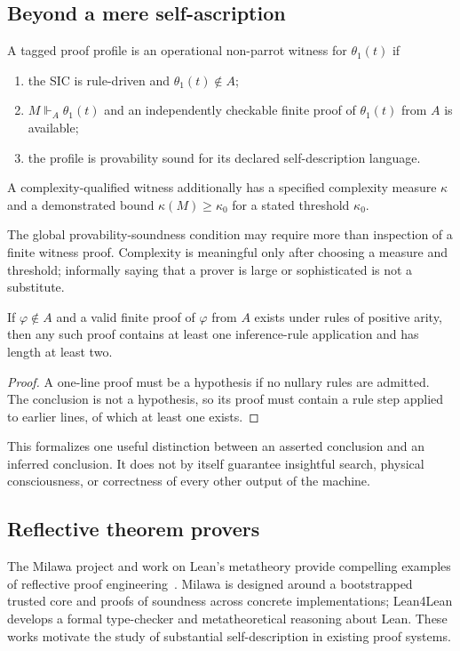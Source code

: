 \documentclass[11pt,letterpaper]{article}
\begin{document}
\subsection{Beyond a mere self-ascription}
\begin{definition}
A tagged proof profile is an operational non-parrot witness for $\theta_1(t)$ if
\begin{enumerate}
\item the SIC is rule-driven and $\theta_1(t)\notin A$;
\item $M\Vdash_A\theta_1(t)$ and an independently checkable finite proof of $\theta_1(t)$ from $A$ is available;
\item the profile is provability sound for its declared self-description language.
\end{enumerate}
A complexity-qualified witness additionally has a specified complexity measure $\kappa$ and a demonstrated bound $\kappa(M)\ge\kappa_0$ for a stated threshold $\kappa_0$.
\end{definition}
The global provability-soundness condition may require more than inspection of a finite witness proof. Complexity is meaningful only after choosing a measure and threshold; informally saying that a prover is large or sophisticated is not a substitute.

\begin{proposition}
If $\varphi\notin A$ and a valid finite proof of $\varphi$ from $A$ exists under rules of positive arity, then any such proof contains at least one inference-rule application and has length at least two.
\end{proposition}
\begin{proof}
A one-line proof must be a hypothesis if no nullary rules are admitted. The conclusion is not a hypothesis, so its proof must contain a rule step applied to earlier lines, of which at least one exists.
\end{proof}
This formalizes one useful distinction between an asserted conclusion and an inferred conclusion. It does not by itself guarantee insightful search, physical consciousness, or correctness of every other output of the machine.

\subsection{Reflective theorem provers}
The Milawa project and work on Lean's metatheory provide compelling examples of reflective proof engineering~\cite{davis,milawa,lean4lean}. Milawa is designed around a bootstrapped trusted core and proofs of soundness across concrete implementations; Lean4Lean develops a formal type-checker and metatheoretical reasoning about Lean. These works motivate the study of substantial self-description in existing proof systems.
\end{document}
